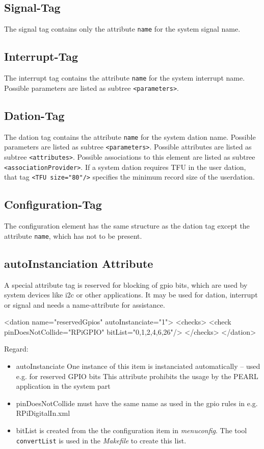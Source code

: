 \subsection{Signal-Tag}
The signal tag contains only the attribute \verb|name| for the
system signal name.

\subsection{Interrupt-Tag}
The interrupt tag contains the attribute \verb|name| for the
system interrupt name.
Possible parameters are listed as subtree \verb|<parameters>|.

\subsection{Dation-Tag}
The dation tag contains the attribute \verb|name| for the
system dation name.
Possible parameters are listed as subtree \verb|<parameters>|.
Possible attributes are listed as subtree \verb|<attributes>|.
Possible associations to this element are
 listed as subtree \verb|<associationProvider>|.
If a system dation requires TFU in the user dation, that tag
\verb|<TFU size="80"/>| specifies the minimum record size of the 
userdation.


\subsection{Configuration-Tag}
The configuration element has the same structure as the dation tag
except the attribute \verb|name|, which has not to be present.

\subsection{autoInstanciation Attribute}
A special attribute tag is reserved for
blocking of gpio bits, which are used by system devices like i2c or 
other applications. It may be used for dation, interrupt or signal and 
needs a name-attribute for assistance.
\begin{XMLCode}
<dation name="reservedGpios" autoInstanciate="1">
  <checks>
    <check pinDoesNotCollide="RPiGPIO" bitList="0,1,2,4,6,26"/>
  </checks>
</dation>
\end{XMLCode}

Regard:
\begin{itemize}
\item autoInstanciate
  One instance of this item is instanciated automatically -- used e.g. 
  for reserved  GPIO bits
  This attribute prohibits the usage by the PEARL application in the system part
\item pinDoesNotCollide must have  the same name as used in the gpio rules in 
   e.g. RPiDigitalIn.xml
\item bitList is created from the the configuration item in \textit{menuconfig}.
The tool \texttt{convertList} is used in the \textit{Makefile} to create this list.
\end{itemize}

